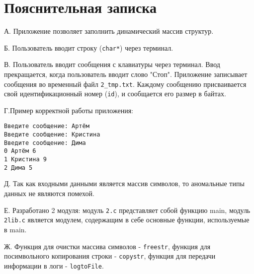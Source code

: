 \documentclass[a4paper, 14pt] {extarticle}
\begin{document}
\section*{Пояснительная записка}

А. Приложение позволяет заполнить динамический массив структур.

Б. Пользователь вводит строку (\texttt{char*}) через терминал.

В. Пользователь вводит сообщения с клавиатуры через терминал. Ввод прекращается, когда пользователь вводит слово "Стоп". Приложение записывает сообщения во временный файл \texttt{2\_tmp.txt}. Каждому сообщению присваивается свой идентификационный номер (\texttt{id}), и сообщается его размер в байтах.

Г.Пример корректной работы приложения:
\begin{verbatim}
Введите сообщение: Артём
Введите сообщение: Кристина
Введите сообщение: Дима
0 Артём 6
1 Кристина 9
2 Дима 5
\end{verbatim}

Д. Так как входными данными является массив символов, то аномальные типы данных не являются помехой.

Е. Разработано 2 модуля: модуль \texttt{2.с} представляет собой функцию main, модуль \texttt{2lib.с} является модулем, содержащим в себе основные функции, используемые в main.

Ж. Функция для очистки массива символов - \texttt{freestr}, функция для посимвольного копирования строки - \texttt{copystr}, функция для передачи информации в логи - \texttt{logtoFile}.
\end{document}
